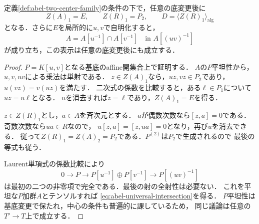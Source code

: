\begin{lemma}[低次中心の内在性と普遍的な交差表示]
\label{lem:abel-universal-center-and-cech}
定義\ref{def:abel-two-center-family}の条件の下で，任意の底変更後に
\begin{equation}\label{eq:abel-intrinsic-center}
 Z(A)_1=E,\qquad Z(R)_1=P_2,\qquad
 D=\langle Z(R)_1\rangle_{\mathrm{alg}}
\end{equation}
となる．さらに$E$を局所的に$u,v$で自明化すると，
\begin{equation}\label{eq:abel-universal-intersection}
 A=A[u^{-1}]\cap A[v^{-1}]
       \quad\text{in }A[(uv)^{-1}]
\end{equation}
が成り立ち，この表示は任意の底変更後にも成立する．
\end{lemma}
\begin{proof}
$P=K[u,v]$となる基底のaffine開集合上で証明する．
$A$の$P$平坦性から，$u,v,uv$による乗法は単射である．
$z\in Z(A)_1$なら，$uz,vz\in P_2$であり，$u(vz)=v(uz)$を満たす．
二次式の係数を比較すると，ある$\ell\in P_1$について$uz=u\ell$となる．
$u$を消去すれば$z=\ell$であり，$Z(A)_1=E$を得る．

$z\in Z(R)_1$とし，$a\in A$を斉次元とする．
$a$が偶数次数なら$[z,a]=0$である．奇数次数なら$ua\in R$なので，
$u[z,a]=[z,ua]=0$となり，再び$u$を消去できる．
従って$Z(R)_1=Z(A)_2=P_2$である．$P^{(2)}$は$P_2$で生成されるので
最後の等式も従う．

Laurent単項式の係数比較により
\[
 0\longrightarrow P\longrightarrow P[u^{-1}]\oplus P[v^{-1}]
       \longrightarrow P[(uv)^{-1}]
\]
は最初の二つの非零項で完全である．最後の射の全射性は必要ない．
これを平坦な$P$加群$A$とテンソルすれば
\eqref{eq:abel-universal-intersection}を得る．
$P$平坦性は基底変更で保たれ，中心の条件も普遍的に課しているため，
同じ議論は任意の$T'\to T$上で成立する．
\end{proof}

